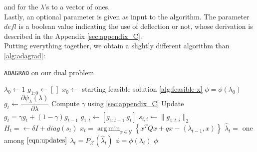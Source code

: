\documentclass[notitlepage]{article}
\DeclareMathOperator*{\argmin}{arg\,min}
\begin{document}
and for the $\lambda$'s to a vector of ones.\\
Lastly, an optional parameter is given as input to the algorithm. The parameter $defl$ is a boolean value indicating the use of deflection or not, whose derivation is described in the Appendix \ref{sec:appendix_C}.\\
Putting everything together, we obtain a slightly different algorithm than \ref{alg:adagrad}:

\begin{algorithm}[H]
  \caption{\texttt{ADAGRAD} on our dual problem}
  \label{alg:my_alg}
  \begin{algorithmic}
      \State $\lambda_0 \gets 1$
      \State $g_{1:0} \gets \left[\,\right]$
      \State $x_0 \gets$ starting feasible solution \ref{alg:feasible-x}
      \State $\phi = \phi(\lambda_0)$
        \State $g_t \gets \dfrac{\partial \psi_\lambda(\lambda)}{\partial \lambda}$
            \State Compute $\gamma$ using \ref{sec:appendix_C}
            \State Update $g_t = \gamma g_t + (1 - \gamma) g_{t-1}$
          \EndIf
        \State $g_{1:t} \gets \left[ g_{1:t-1}\ g_t \right]$
        \State $s_{t,i} \gets \| g_{1:t,i} \|_2$
        \State $H_t = \gets \delta \mathit{I} + diag(s_t)$
        \State $x_t = \argmin_{x \in \mathcal{Y}} \left\lbrace x^T Q x + q x - \left\langle \lambda_{t-1},x \right\rangle \right\rbrace$
        \State $\hat{\lambda}_t =$ one among $\eqref{eqn:updates}$
        \State $\lambda_t = P_\mathcal{X}(\hat{\lambda}_t)$ 
          \State $\phi = \phi(\lambda_t)$
        \EndIf
          \State \Return $\phi$ 
        \EndIf
      \EndFor
    \EndFunction
  \end{algorithmic}  
\end{algorithm}
\end{document}
